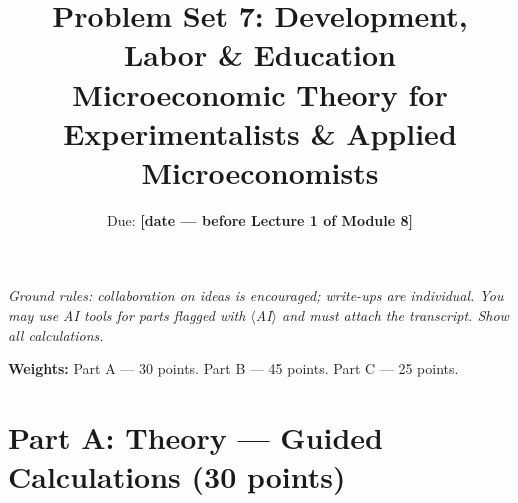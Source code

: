 \documentclass[11pt]{article}
\title{Problem Set 7: Development, Labor \& Education\\
\large Microeconomic Theory for Experimentalists \& Applied Microeconomists}
\author{Due: \textbf{[date --- before Lecture 1 of Module 8]}}
\date{}
\begin{document}
\maketitle

\noindent\emph{Ground rules: collaboration on ideas is encouraged; write-ups
are individual. You may use AI tools for parts flagged with
$\langle$AI$\rangle$ and must attach the transcript. Show all calculations.}

\medskip

\noindent\textbf{Weights:} Part A --- 30 points. Part B --- 45 points.
Part C --- 25 points.

\bigskip

\section*{Part A: Theory --- Guided Calculations (30 points)}
\end{document}
